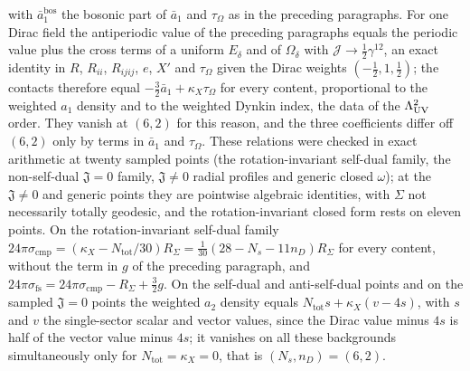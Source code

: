 with \(\bar a_1^{\mathrm{bos}}\) the bosonic part of \(\bar a_1\) and \(\tau_\Omega\) as in the preceding paragraphs. For one Dirac field the antiperiodic value of the preceding paragraphs equals the periodic value plus the cross terms of a uniform \(E_\delta\) and of \(\Omega_\delta\) with \(\mathcal J\to\tfrac12\gamma^{12}\), an exact identity in \(R\), \(R_{ii}\), \(R_{ijij}\), \(e\), \(X'\) and \(\tau_\Omega\) given the Dirac weights \((-\tfrac12,1,\tfrac12)\); the contacts therefore equal \(-\tfrac32\bar a_1+\kappa_X\tau_\Omega\) for every content, proportional to the weighted \(a_1\) density and to the weighted Dynkin index, the data of the \(\Lambda_{\mathrm{UV}}^2\) order. They vanish at \((6,2)\) for this reason, and the three coefficients differ off \((6,2)\) only by terms in \(\bar a_1\) and \(\tau_\Omega\). These relations were checked in exact arithmetic at twenty sampled points (the rotation-invariant self-dual family, the non-self-dual \(\mathfrak J=0\) family, \(\mathfrak J\neq0\) radial profiles and generic closed \(\omega\)); at the \(\mathfrak J\neq0\) and generic points they are pointwise algebraic identities, with \(\Sigma\) not necessarily totally geodesic, and the rotation-invariant closed form rests on eleven points. On the rotation-invariant self-dual family \(24\pi\sigma_{\mathrm{cmp}}=(\kappa_X-N_{\mathrm{tot}}/30)R_\Sigma=\tfrac{1}{30}(28-N_s-11n_D)R_\Sigma\) for every content, without the term in \(g\) of the preceding paragraph, and \(24\pi\sigma_{\mathrm{fs}}=24\pi\sigma_{\mathrm{cmp}}-R_\Sigma+\tfrac32g\). On the self-dual and anti-self-dual points and on the sampled \(\mathfrak J=0\) points the weighted \(a_2\) density equals \(N_{\mathrm{tot}}s+\kappa_X(v-4s)\), with \(s\) and \(v\) the single-sector scalar and vector values, since the Dirac value minus \(4s\) is half of the vector value minus \(4s\); it vanishes on all these backgrounds simultaneously only for \(N_{\mathrm{tot}}=\kappa_X=0\), that is \((N_s,n_D)=(6,2)\).

